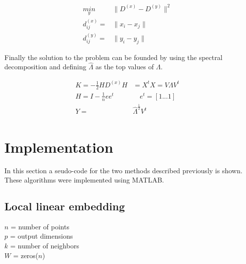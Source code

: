 \documentclass[a0,portrait]{a0poster}
\begin{document}
\begin{multicols}{3}
        \begin{equation*}
            \begin{aligned}
                \underset{y}{min} \quad &\lVert D^{(x)} - D^{(y)} \rVert ^2\\
                d_{ij}^{(x)} =& \lVert x_i - x_j \rVert\\
                d_{ij}^{(y)} =& \lVert y_i - y_j \rVert
            \end{aligned}
        \end{equation*}

    Finally the solution to the problem can be founded by using the spectral
    decomposition and defining $\hat{\Lambda}$ as the top values of $\Lambda$.

        \begin{equation*}
            \begin{aligned}
                K = -\frac{1}{2} H D^{(x)} H &= X^t X = V \Lambda V^t\\
                H = I - \frac{1}{n} e e^t &\quad e^t = [1 ... 1]\\
                Y =& \hat{\Lambda}^{\frac{1}{2}} V^t\\
            \end{aligned}
        \end{equation*}

    \section*{Implementation}

    In this section a seudo-code for the two methods described previously is
    shown. These algorithms were implemented using MATLAB.

    \subsection*{Local linear embedding}

    $n$ = number of points\\
    $p$ = output dimensions\\
    $k$ = number of neighbors\\

    $W$ = zeros($n$)\\
    \vspace{0.5cm}


\end{multicols}
\end{document}
